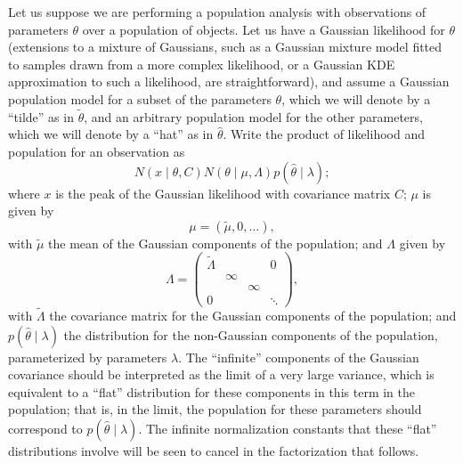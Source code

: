 \documentclass[modern]{aastex631}
\begin{document}
Let us suppose we are performing a population analysis with observations of
parameters $\theta$ over a population of objects.  Let us have a Gaussian
likelihood for $\theta$ (extensions to a mixture of Gaussians, such as a
Gaussian mixture model fitted to samples drawn from a more complex likelihood,
or a Gaussian KDE approximation to such a likelihood, are straightforward), and
assume a Gaussian population model for a subset of the parameters $\theta$,
which we will denote by a ``tilde'' as in $\tilde{\theta}$, and an arbitrary
population model for the other parameters, which we will denote by a ``hat'' as
in $\hat{\theta}$.  Write the product of likelihood and population for an
observation as 
\begin{equation}
    \label{eq:likelihood-population}
    N\left( x \mid \theta, C \right) N\left( \theta \mid \mu, \Lambda \right) p\left( \hat{\theta} \mid \lambda \right);
\end{equation}
where $x$ is the peak of the Gaussian likelihood with covariance matrix $C$; $\mu$ is given by 
\begin{equation}
    \mu = \left( \tilde{\mu}, 0, \ldots \right),
\end{equation} 
with $\tilde{\mu}$ the mean of the Gaussian components of the population; and
$\Lambda$ given by 
\begin{equation}
    \Lambda = \begin{pmatrix}
        \tilde{\Lambda} &  &  & 0 \\
          & \infty &  &  \\ 
          &   & \infty &  \\
        0 &   &        & \ddots 
    \end{pmatrix},
\end{equation}
with $\tilde{\Lambda}$ the covariance matrix for the Gaussian components of the
population; and $p\left( \hat{\theta} \mid \lambda \right)$ the distribution for
the non-Gaussian components of the population, parameterized by parameters
$\lambda$.  The ``infinite'' components of the Gaussian covariance should be
interpreted as the limit of a very large variance, which is equivalent to a
``flat'' distribution for these components in this term in the population; that
is, in the limit, the population for these parameters should correspond to
$p\left( \hat{\theta} \mid \lambda \right)$.  The infinite normalization
constants that these ``flat'' distributions involve will be seen to cancel in
the factorization that follows.
\end{document}
